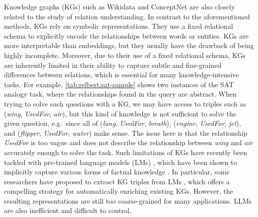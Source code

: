 \documentclass[3p]{elsarticle}
\begin{document}
{Knowledge graphs (KGs) such as Wikidata \cite{vrandevcic2014wikidata} and ConceptNet \cite{conceptnet2017} are also closely related to the study of relation understanding. In contrast to the aforementioned methods, KGs rely on symbolic representations. They use a fixed relational schema to explicitly encode the relationships between words or entities. KGs are more interpretable than embeddings, but they usually have the drawback of being highly incomplete.
Moreover, due to their use of a fixed relational schema, KGs are inherently limited in their ability to capture subtle and fine-grained differences between relations, which is essential for many knowledge-intensive tasks. For example, \autoref{tab:relbert:sat-sample} shows two instances of 
 the SAT analogy task, where the relationships found in the query are abstract. When trying to solve such questions with a KG, we may have access to triples such as (\emph{wing}, \emph{UsedFor}, \emph{air}), but this kind of knowledge is not sufficient to solve the given question, e.g.\ since all of (\emph{lung}, \emph{UsedFor}, \emph{breath}), (\emph{engine}, \emph{UsedFor}, \emph{jet}), and (\emph{flipper}, \emph{UsedFor}, \emph{water}) make sense. The issue here is that the relationship \emph{UsedFor} is too vague and does not describe the relationship between \emph{wing} and \emph{air} accurately enough to solve the task. Such limitations of KGs have recently been tackled with pre-trained language models (LMs) \cite{devlin-etal-2019-bert,GPT3,2020t5}, which have been shown to implicitly capture various forms of factual knowledge  \cite{petroni-etal-2019-language,jiang-etal-2020-know,heinzerling-inui-2021-language}. In particular, some researchers have proposed to extract KG triples from LMs \cite{west-etal-2022-symbolic,hao2022bertnet,cohen2023crawling}, which offers a compelling strategy for automatically enriching existing KGs. 
However, the resulting representations are still too coarse-grained for many applications. LLMs are also inefficient and difficult to control. %

}
\end{document}
